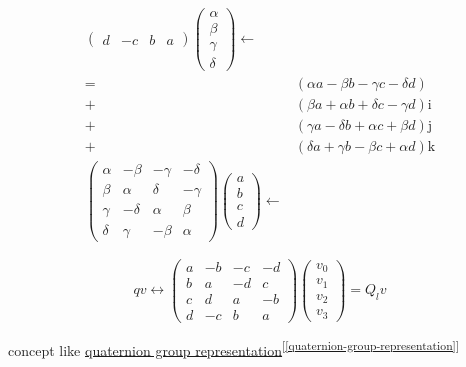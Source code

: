 \documentclass[
]{book}
\theoremstyle{definition}
\theoremstyle{definition}
\theoremstyle{definition}
\theoremstyle{definition}
\theoremstyle{remark}
\begin{document}
\[\begin{aligned}
\begin{pmatrix}
d & -c & b & a
\end{pmatrix}\begin{pmatrix}\alpha\\
\beta\\
\gamma\\
\delta
\end{pmatrix}\leftarrow\\
= & \left(\alpha a-\beta b-\gamma c-\delta d\right)\\
+ & \left(\beta a+\alpha b+\delta c-\gamma d\right)\mathrm{i}\\
+ & \left(\gamma a-\delta b+\alpha c+\beta d\right)\mathrm{j}\\
+ & \left(\delta a+\gamma b-\beta c+\alpha d\right)\mathrm{k}\\
\begin{pmatrix}\alpha & -\beta & -\gamma & -\delta\\
\beta & \alpha & \delta & -\gamma\\
\gamma & -\delta & \alpha & \beta\\
\delta & \gamma & -\beta & \alpha
\end{pmatrix}\begin{pmatrix}a\\
b\\
c\\
d
\end{pmatrix}\leftarrow
\end{aligned}
\]

\[
qv\leftrightarrow\begin{pmatrix}a & -b & -c & -d\\
b & a & -d & c\\
c & d & a & -b\\
d & -c & b & a
\end{pmatrix}\begin{pmatrix}v_{{\scriptscriptstyle 0}}\\
v_{{\scriptscriptstyle 1}}\\
v_{{\scriptscriptstyle 2}}\\
v_{{\scriptscriptstyle 3}}
\end{pmatrix}=Q_{{\scriptscriptstyle l}}v
\]

concept like \protect\hyperlink{quaternion-group-representation}{quaternion group representation}\textsuperscript{{[}\ref{quaternion-group-representation}{]}}
\end{document}
